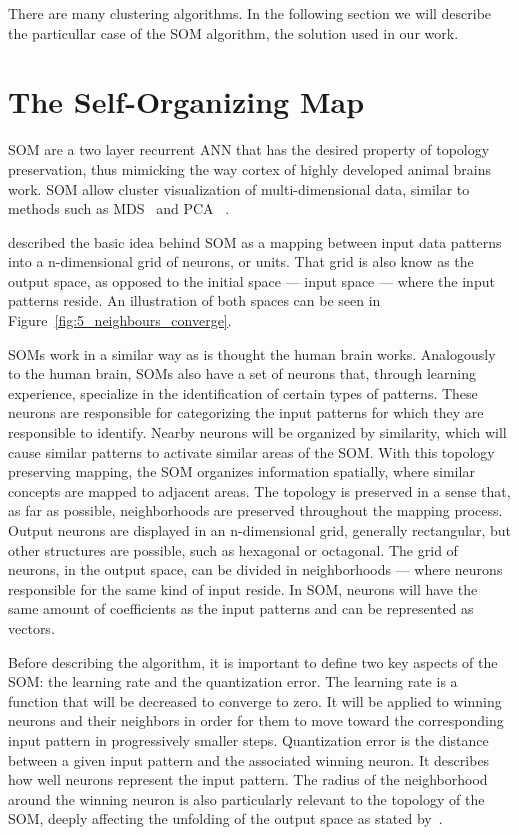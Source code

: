 There are many clustering algorithms. In the following section we will describe the particullar case of the \ac{SOM} algorithm, the solution used in our work.

\section{The Self-Organizing Map} 
\label{sec:the_self_organizing_map}

\ac{SOM} are a two layer recurrent \ac{ANN} that has the desired property of topology preservation, thus mimicking the way cortex of highly developed animal brains work. \ac{SOM} allow cluster visualization of multi-dimensional data, similar to methods such as \ac{MDS}~\cite{KruskalWish1978} and \ac{PCA}~\cite{Hotelling_1933} .  

\citet{Bacao2005} described the basic idea behind \ac{SOM} as a mapping between input data patterns into a n-dimensional grid of neurons, or units. That grid is also know as the output space, as opposed to the initial space --- input space --- where the input patterns reside. An illustration of both spaces can be seen in Figure~\ref{fig:5_neighbours_converge}.

SOMs work in a similar way as is thought the human brain works. Analogously to the human brain, SOMs also have a set of neurons that, through learning experience, specialize in the identification of certain types of patterns. These neurons are responsible for categorizing the input patterns for which they are responsible to identify. Nearby neurons will be organized by similarity, which will cause similar patterns to activate similar areas of the \ac{SOM}.
With this topology preserving mapping, the \ac{SOM} organizes information spatially, where similar concepts are mapped to adjacent areas. The topology is preserved in a sense that, as far as possible, neighborhoods are preserved throughout the mapping process.
Output neurons are displayed in an n-dimensional grid, generally rectangular, but other structures are possible, such as hexagonal or octagonal.  The grid of neurons, in the output space, can be divided in neighborhoods --- where neurons responsible for the same kind of input reside.
In \ac{SOM}, neurons will have the same amount of coefficients as the input patterns and can be represented as vectors.

Before describing the algorithm, it is important to define two key aspects of the \ac{SOM}: the learning rate and the quantization error. The learning rate is a function that will be decreased to converge to zero. It will be applied to winning neurons and their neighbors in order for them to move toward the corresponding input pattern in progressively smaller steps. Quantization error is the distance between a given input pattern and the associated winning neuron. It describes how well neurons represent the input pattern. The radius of the neighborhood around the winning neuron is also particularly relevant to the topology of the \ac{SOM}, deeply affecting the unfolding of the output space as stated by~\citet{Bacao2005}. 

